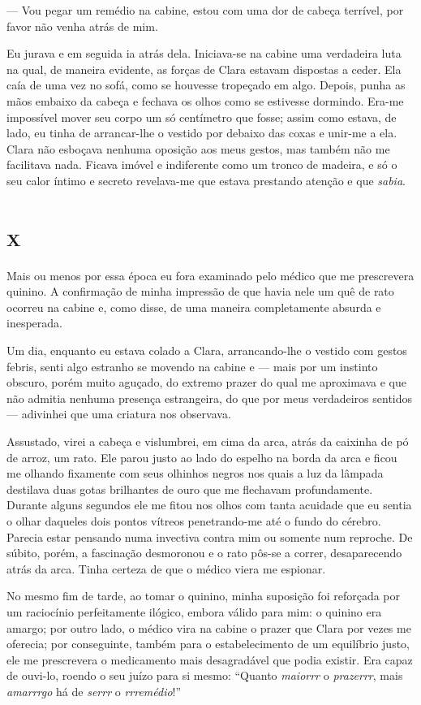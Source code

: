 --- Vou pegar um remédio na cabine, estou com uma dor de cabeça terrível, por favor não venha atrás de mim.

Eu jurava e em seguida ia atrás dela. Iniciava-se na cabine uma verdadeira luta na qual, de maneira evidente, as forças de Clara estavam dispostas a ceder. Ela caía de uma vez no sofá, como se houvesse tropeçado em algo. Depois, punha as mãos embaixo da cabeça e fechava os olhos como se estivesse dormindo. Era-me impossível mover seu corpo um só centímetro que fosse; assim como estava, de lado, eu tinha de arrancar-lhe o vestido por debaixo das coxas e unir-me a ela. Clara não esboçava nenhuma oposição aos meus gestos, mas também não me facilitava nada. Ficava imóvel e indiferente como um tronco de madeira, e só o seu calor íntimo e secreto revelava-me que estava prestando atenção e que \textit{sabia}.


\chapter*{\huge\centering\textsc{x}}

Mais ou menos por essa época eu fora examinado pelo médico que me prescrevera quinino. A confirmação de minha impressão de que havia nele um quê de rato ocorreu na cabine e, como disse, de uma maneira completamente absurda e inesperada. 

Um dia, enquanto eu estava colado a Clara, arrancando-lhe o vestido com gestos febris, senti algo estranho se movendo na cabine e --- mais por um instinto obscuro, porém muito aguçado, do extremo prazer do qual me aproximava e que não admitia nenhuma presença estrangeira, do que por meus verdadeiros sentidos --- adivinhei que uma criatura nos observava.

Assustado, virei a cabeça e vislumbrei, em cima da arca, atrás da caixinha de pó de arroz, um rato. Ele parou justo ao lado do espelho na borda da arca e ficou me olhando fixamente com seus olhinhos negros nos quais a luz da lâmpada destilava duas gotas brilhantes de ouro que me flechavam profundamente. Durante alguns segundos ele me fitou nos olhos com tanta acuidade que eu sentia o olhar daqueles dois pontos vítreos penetrando-me até o fundo do cérebro. Parecia estar pensando numa invectiva contra mim ou somente num reproche. De súbito, porém, a fascinação desmoronou e o rato pôs-se a correr, desaparecendo atrás da arca. Tinha certeza de que o médico viera me espionar.

No mesmo fim de tarde, ao tomar o quinino, minha suposição foi reforçada por um raciocínio perfeitamente ilógico, embora válido para mim: o quinino era amargo; por outro lado, o médico vira na cabine o prazer que Clara por vezes me oferecia; por conseguinte, também para o estabelecimento de um equilíbrio justo, ele me prescrevera o medicamento mais desagradável que podia existir. Era capaz de ouvi-lo, roendo o seu juízo para si mesmo: ``Quanto \textit{maiorrr} o \textit{prazerrr}, mais \textit{amarrrgo} há de \textit{serrr} o \textit{rrremédio}!''

